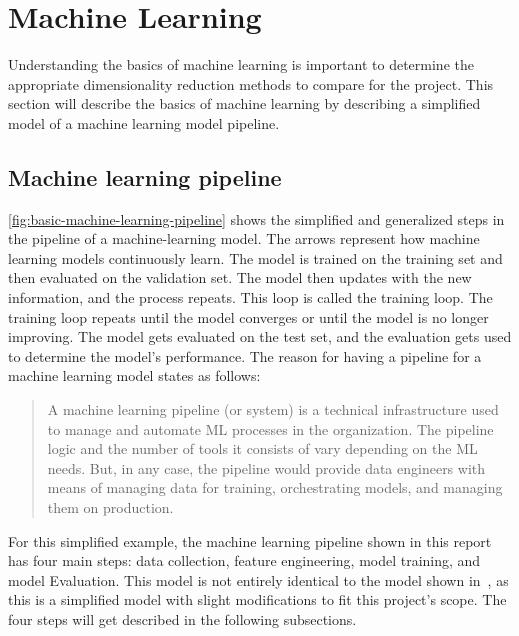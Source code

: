 
\section{Machine Learning}\label{sec:theory-machine-learning}
Understanding the basics of machine learning is important to determine the appropriate dimensionality reduction methods to compare for the project. This section will describe the basics of machine learning by describing a simplified model of a machine learning model pipeline.


\subsection{Machine learning pipeline}\label{subsec:machine-learning-pipeline}
\autoref{fig:basic-machine-learning-pipeline} shows the simplified and generalized steps in the pipeline of a machine-learning model. The arrows represent how machine learning models continuously learn. The model is trained on the training set and then evaluated on the validation set. The model then updates with the new information, and the process repeats. This loop is called the training loop. The training loop repeats until the model converges or until the model is no longer improving. The model gets evaluated on the test set, and the evaluation gets used to determine the model's performance. The reason for having a pipeline for a machine learning model states as follows:

\blockcquote{machine-learning-pipeline-architecture}{A machine learning pipeline (or system) is a technical infrastructure used to manage and automate ML processes in the organization. The pipeline logic and the number of tools it consists of vary depending on the ML needs. But, in any case, the pipeline would provide data engineers with means of managing data for training, orchestrating models, and managing them on production.}

For this simplified example, the machine learning pipeline shown in this report has four main steps: data collection, feature engineering, model training, and model Evaluation. This model is not entirely identical to the model shown in~\cite{machine-learning-pipeline-architecture}, as this is a simplified model with slight modifications to fit this project's scope. The four steps will get described in the following subsections.



